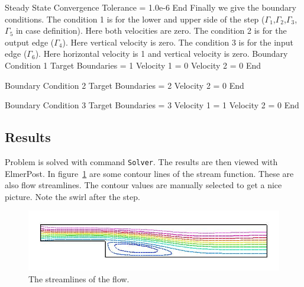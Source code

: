   Steady State Convergence Tolerance = 1.0e-6
End  
\ttend
Finally we give the boundary conditions.
The condition 1 is for the lower and upper side of the step 
($\Gamma_1$,$\Gamma_2$,$\Gamma_3$,$\Gamma_5$ in case definition).
Here both velocities are zero.
The condition 2 is for the output edge ($\Gamma_4$). Here vertical velocity is zero. 
The condition 3 is for the input edge ($\Gamma_6$). Here horizontal velocity is 1 and 
vertical velocity is zero.
\ttbegin
Boundary Condition 1
  Target Boundaries = 1
  Velocity 1 = 0
  Velocity 2 = 0
End

Boundary Condition 2
  Target Boundaries = 2
  Velocity 2 = 0
End

Boundary Condition 3
  Target Boundaries = 3
  Velocity 1 = 1
  Velocity 2 = 0
End
\ttend
\subsection*{Results}
Problem is solved with command {\tt Solver}. The results are then viewed with
ElmerPost.  In figure~\ref{f:streamlines} are some contour lines of the stream
function. These are also flow streamlines. The contour values are manually
selected to get a nice picture. Note the swirl after the step.
\begin{figure}[!hb]
\begin{center}
\includegraphics[width=1.0\textwidth]{lines}
\end{center}
\caption{The streamlines of the flow.}
\label{f:streamlines}
\end{figure}







